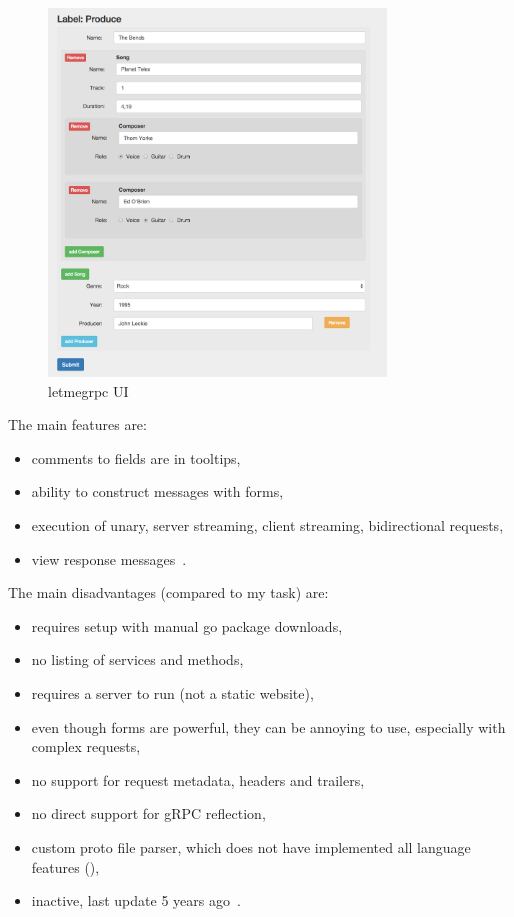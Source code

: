 \begin{figure}[hbt!]
    \centering
    \captionsetup{justification=centering}
    \includegraphics[width=0.8\textwidth]{images/grpc/letmegrpc}
    \caption{letmegrpc UI~\cite{grpc-letmegrpc}}
    \label{fig:grpc-letmegrpc}
\end{figure}

The main features are:
\begin{itemize}
    \item comments to fields are in tooltips,
    \item ability to construct messages with forms,
    \item execution of unary, server streaming, client streaming, bidirectional requests,
    \item view response messages~\cite{grpc-letmegrpc}.
\end{itemize}

The main disadvantages (compared to my task) are:
\begin{itemize}
    \item requires setup with manual go package downloads,
    \item no listing of services and methods,
    \item requires a server to run (not a static website),
    \item even though forms are powerful, they can be annoying to use, especially with complex requests,
    \item no support for request metadata, headers and trailers,
    \item no direct support for gRPC reflection,
    \item custom proto file parser, which does not have implemented all language features (\cite{grpc-letmegrpc-issue44}),
    \item inactive, last update 5 years ago~\cite{grpc-letmegrpc}.
\end{itemize}

